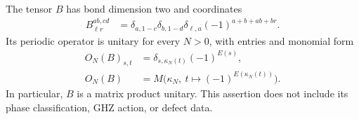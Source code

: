 \begin{lemma}
    \label{thm:mpug_czx_exact_tensor_unitary}
    \leanok
    The tensor $B$ has bond dimension two and coordinates
    \begin{align}
        B^{ab,cd}_{\ell r}
         & =\delta_{a,1-c}\delta_{b,1-d}\delta_{\ell,a}
        (-1)^{a+b+ab+br}.
    \end{align}
    Its periodic operator is unitary for every $N>0$, with entries and
    monomial form
    \begin{align}
        O_N(B)_{s,t} & =\delta_{s,\kappa_N(t)}(-1)^{E(s)},                     \\
        O_N(B)       & =M\bigl(\kappa_N,\ t\mapsto(-1)^{E(\kappa_N(t))}\bigr).
    \end{align}
    In particular, $B$ is a matrix product unitary. This assertion does
    not include its phase classification, GHZ action, or defect data.
\end{lemma}
